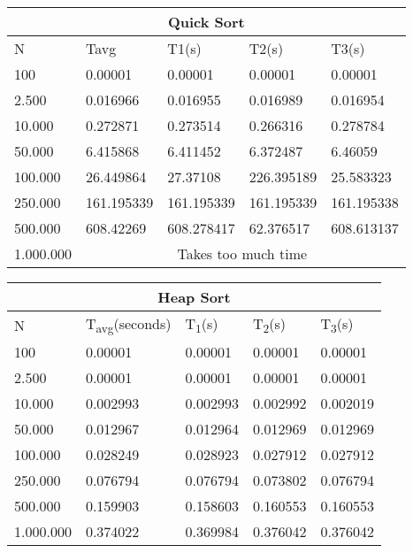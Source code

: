 \documentclass[]{article}
\begin{document}
\iffalse
	QUICK SORT
\fi

\begin{table}[H]
	\centering
\begin{tabular}{|l|l|l|l|l|}
\hline
\multicolumn{5}{|c|}{Quick Sort} \\ \hline
N & Tavg & T1(s) & T2(s) & T3(s) \\ \hline
100 & 0.00001 & 0.00001 & 0.00001 & 0.00001 \\ \hline
2.500 & 0.016966 & 0.016955 & 0.016989 & 0.016954 \\ \hline
10.000 & 0.272871 & 0.273514 & 0.266316 & 0.278784 \\ \hline
50.000 & 6.415868 & 6.411452 & 6.372487 & 6.46059 \\ \hline
100.000 & 26.449864 & 27.37108 & 226.395189 & 25.583323 \\ \hline
250.000 & 161.195339 & 161.195339 & 161.195339 & 161.195338 \\ \hline
500.000 & 608.42269 & 608.278417 & 62.376517 & 608.613137 \\ \hline
1.000.000 & \multicolumn{4}{c|}{Takes too much time} \\ \hline
\end{tabular}
\end{table}

\iffalse
	HEAP SORT
\fi

\begin{table}[H]
	\centering
\begin{tabular}{|l|l|l|l|l|}
\hline
\multicolumn{5}{|c|}{Heap Sort} \\ \hline
N & T\textsubscript{avg}(seconds) & T\textsubscript{1}(s) & T\textsubscript{2}(s) & T\textsubscript{3}(s) \\ \hline
100 & 0.00001 & 0.00001 & 0.00001 & 0.00001 \\ \hline
2.500 & 0.00001 & 0.00001 & 0.00001 & 0.00001 \\ \hline
10.000 & 0.002993 & 0.002993 & 0.002992 & 0.002019 \\ \hline
50.000 & 0.012967 & 0.012964 & 0.012969 & 0.012969 \\ \hline
100.000 & 0.028249 & 0.028923 & 0.027912 & 0.027912 \\ \hline
250.000 & 0.076794 & 0.076794 & 0.073802 & 0.076794 \\ \hline
500.000 & 0.159903 & 0.158603 & 0.160553 & 0.160553 \\ \hline
1.000.000 & 0.374022 & 0.369984 & 0.376042 & 0.376042 \\ \hline
\end{tabular}
\end{table}
\end{document}
